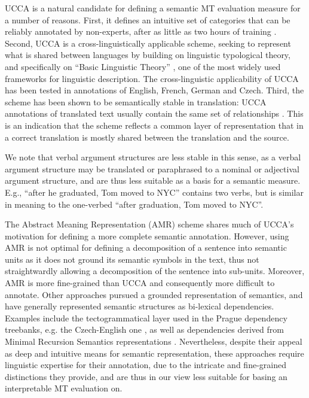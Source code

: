 \documentclass[11pt]{article}
\newcommand{\oa}[1]{\footnote{\color{red}OA: #1}}
\def\parcite#1{\cite{#1}}
\begin{document}
UCCA is a natural candidate for defining a semantic
MT evaluation measure for a number of reasons. 
First, it defines an intuitive set of categories
that can be reliably annotated by non-experts, after as little as two hours
of training \cite{marinotti2014}.
Second, UCCA is a cross-linguistically applicable scheme, seeking to
represent what is shared between languages
by building on linguistic typological theory, and specifically on ``Basic Linguistic Theory''
\cite{Dixon:10a,Dixon:10b,Dixon:12}, one of the most widely used frameworks for linguistic description.
The cross-linguistic applicability of UCCA has been tested in annotations of
English, French, German and Czech.
Third, the scheme has been shown to be semantically stable
in translation: UCCA annotations of translated text usually contain the same set of relationships
\cite{sulem2015conceptual}. This is an indication that the scheme reflects
a common layer of representation that in a correct translation
is mostly shared between the translation and the source. 

We note that verbal argument structures are less stable in this sense, as a verbal
argument structure may be translated or paraphrased to a nominal or adjectival
argument structure, and are thus less suitable as a basis for a semantic measure.
E.g., ``after he graduated, Tom moved to NYC'' contains two verbs,
but is similar in meaning to the one-verbed
``after graduation, Tom moved to NYC''. 


The Abstract Meaning Representation (AMR) scheme \cite{banarescu2013abstract}
shares much of UCCA's motivation for defining a more complete semantic annotation.
However, using AMR is not optimal for defining a decomposition of a sentence into semantic
units as it does not ground its semantic symbols in the text,
thus not straightwardly allowing a decomposition of the sentence into sub-units.
Moreover, AMR is more fine-grained than UCCA and consequently more difficult to annotate.
Other approaches pursued a grounded representation of semantics,
and have generally represented semantic structures as bi-lexical dependencies.
Examples include the tectogrammatical layer \parcite{sgallhp:1986} used in the Prague dependency
treebanks, e.g. the Czech-English one \parcite{hajic2012announcing}, as well
as dependencies derived from Minimal Recursion Semantics representations \parcite{oepen2006discriminant}.
Nevertheless, despite their appeal as deep and intuitive means for semantic representation,
these approaches require linguistic expertise for their annotation, due to the intricate and
fine-grained distinctions they provide, and are thus in our view less suitable for basing
an interpretable MT evaluation on. 
\end{document}
